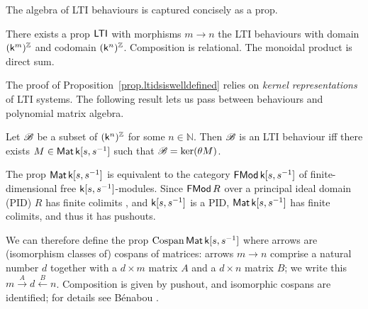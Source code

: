 The algebra of LTI behaviours is captured concisely as a prop.
\begin{proposition} \label{prop.ltidsiswelldefined}
  There exists a prop $\operatorname{\mathsf{LTI}}$ 
  with morphisms $m \to n$ the LTI behaviours with domain $(\mathsf{k}^m)^{\mathbb Z}$ and
  codomain $(\mathsf{k}^n)^{\mathbb Z}$. Composition is relational. The monoidal product is
  direct sum.
\end{proposition}



The proof of Proposition~\ref{prop.ltidsiswelldefined} relies on \emph{kernel
representations} of LTI  systems.  The following result lets us pass between
behaviours and polynomial matrix algebra.
%
%
\begin{theorem} \label{thm.kernelreps}
  Let ${\mathscr B}$ be a subset of $(\mathsf{k}^n)^{\mathbb Z}$ for some $n \in \mathbb N$. Then ${\mathscr B}$ is
  an LTI behaviour iff there exists $M \in
  \operatorname{\mathsf{Mat}}{\mathsf{k}[s,s^{-1}]}$ such that ${\mathscr B} = \mathrm{ker}(\theta M)$.
\end{theorem}


The prop $\operatorname{\mathsf{Mat}} {\mathsf{k}[s,s^{-1}]}$ is equivalent to the category $\operatorname{\mathsf{FMod}}{\mathsf{k}[s,s^{-1}]}$ of
finite-dimensional free ${\mathsf{k}[s,s^{-1}]}$-modules. Since $\operatorname{\mathsf{FMod}} R$ over a principal ideal
domain (PID) $R$ has finite colimits \cite{BSZ2}, and ${\mathsf{k}[s,s^{-1}]}$ is a PID, $\operatorname{\mathsf{Mat}} {\mathsf{k}[s,s^{-1}]}$
has finite colimits, and thus it has pushouts.

We can therefore define the prop $\operatorname{{Cospan}}\operatorname{\mathsf{Mat}}{\mathsf{k}[s,s^{-1}]}$ where arrows are (isomorphism
classes of) cospans of matrices: arrows $m \to n$ comprise a natural number
$d$ together with a $d\times m$ matrix $A$ and a $d\times n$ matrix $B$; we
write this $m\xrightarrow{A} d \xleftarrow{B}n$. Composition is given by
pushout, and isomorphic cospans are identified; for details see B\'enabou 
\cite{Be}.

